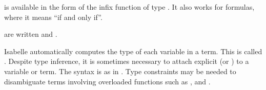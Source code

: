 \begin{isabellebody}
\begin{isamarkuptext}
 is available in the form of the infix function 
of type . It also works for formulas, where
it means ``if and only if''.

 are written  and .

Isabelle automatically computes the type of each variable in a term. This is
called .  Despite type inference, it is sometimes
necessary to attach explicit  (or ) to a variable or term.  The syntax is  as in
\mbox{}. Type constraints may be
needed to
disambiguate terms involving overloaded functions such as ,  and .


\end{isamarkuptext}
\end{isabellebody}
